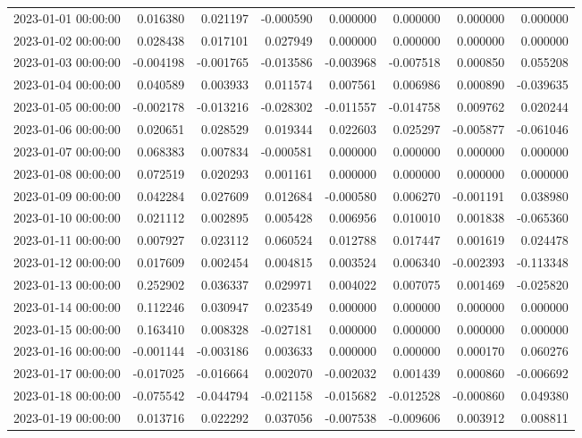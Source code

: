 \begin{tabular}{lrrrrrrr}
2023-01-01 00:00:00 & 0.016380 & 0.021197 & -0.000590 & 0.000000 & 0.000000 & 0.000000 & 0.000000 \\
2023-01-02 00:00:00 & 0.028438 & 0.017101 & 0.027949 & 0.000000 & 0.000000 & 0.000000 & 0.000000 \\
2023-01-03 00:00:00 & -0.004198 & -0.001765 & -0.013586 & -0.003968 & -0.007518 & 0.000850 & 0.055208 \\
2023-01-04 00:00:00 & 0.040589 & 0.003933 & 0.011574 & 0.007561 & 0.006986 & 0.000890 & -0.039635 \\
2023-01-05 00:00:00 & -0.002178 & -0.013216 & -0.028302 & -0.011557 & -0.014758 & 0.009762 & 0.020244 \\
2023-01-06 00:00:00 & 0.020651 & 0.028529 & 0.019344 & 0.022603 & 0.025297 & -0.005877 & -0.061046 \\
2023-01-07 00:00:00 & 0.068383 & 0.007834 & -0.000581 & 0.000000 & 0.000000 & 0.000000 & 0.000000 \\
2023-01-08 00:00:00 & 0.072519 & 0.020293 & 0.001161 & 0.000000 & 0.000000 & 0.000000 & 0.000000 \\
2023-01-09 00:00:00 & 0.042284 & 0.027609 & 0.012684 & -0.000580 & 0.006270 & -0.001191 & 0.038980 \\
2023-01-10 00:00:00 & 0.021112 & 0.002895 & 0.005428 & 0.006956 & 0.010010 & 0.001838 & -0.065360 \\
2023-01-11 00:00:00 & 0.007927 & 0.023112 & 0.060524 & 0.012788 & 0.017447 & 0.001619 & 0.024478 \\
2023-01-12 00:00:00 & 0.017609 & 0.002454 & 0.004815 & 0.003524 & 0.006340 & -0.002393 & -0.113348 \\
2023-01-13 00:00:00 & 0.252902 & 0.036337 & 0.029971 & 0.004022 & 0.007075 & 0.001469 & -0.025820 \\
2023-01-14 00:00:00 & 0.112246 & 0.030947 & 0.023549 & 0.000000 & 0.000000 & 0.000000 & 0.000000 \\
2023-01-15 00:00:00 & 0.163410 & 0.008328 & -0.027181 & 0.000000 & 0.000000 & 0.000000 & 0.000000 \\
2023-01-16 00:00:00 & -0.001144 & -0.003186 & 0.003633 & 0.000000 & 0.000000 & 0.000170 & 0.060276 \\
2023-01-17 00:00:00 & -0.017025 & -0.016664 & 0.002070 & -0.002032 & 0.001439 & 0.000860 & -0.006692 \\
2023-01-18 00:00:00 & -0.075542 & -0.044794 & -0.021158 & -0.015682 & -0.012528 & -0.000860 & 0.049380 \\
2023-01-19 00:00:00 & 0.013716 & 0.022292 & 0.037056 & -0.007538 & -0.009606 & 0.003912 & 0.008811 \\

\end{tabular}
